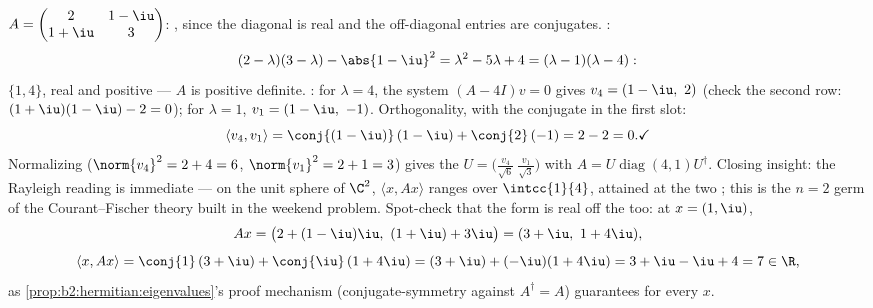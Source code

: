 \begin{example}\label{ex:b2:hermitian:pdrun}
$A = \begin{pmatrix} 2 & 1-\iu\\ 1+\iu & 3\end{pmatrix}$:
, since the diagonal is real and the off-diagonal
entries are conjugates. :
\[
(2-\lambda)(3-\lambda) - \abs{1-\iu}^2
= \lambda^2 - 5\lambda + 4
= (\lambda - 1)(\lambda - 4) :
\]
 $\{1, 4\}$, real and positive --- $A$ is positive
definite. : for $\lambda = 4$, the system $(A -
4I)v = 0$ gives $v_4 = (1 - \iu,\ 2)$ (check the second row:
$(1+\iu)(1-\iu) - 2 = 0$); for $\lambda = 1$, $v_1 = (1 - \iu,\
-1)$. Orthogonality, with the conjugate in the first slot:
\[
\langle v_4, v_1\rangle
= \conj{(1-\iu)}\,(1-\iu) + \conj{2}\,(-1)
= 2 - 2 = 0 . \checkmark
\]
Normalizing ($\norm{v_4}^2 = 2 + 4 = 6$, $\norm{v_1}^2 = 2 + 1
= 3$) gives the  $U = \bigl(\frac{v_4}{\sqrt6}\
\frac{v_1}{\sqrt3}\bigr)$ with $A =
U\operatorname{diag}(4,1)U^\dagger$. Closing insight: the
Rayleigh reading is immediate --- on the unit sphere of
$\C^2$, $\langle x, Ax\rangle$ ranges over $\intcc{1}{4}$,
attained at the two ; this is the $n = 2$ germ of
the Courant--Fischer theory built in the weekend problem.
Spot-check that the form is real off the \omterm{def:b2:reduction:eigen}{eigenvectors} too: at
$x = (1, \iu)$,
\[
Ax = \bigl(2 + (1-\iu)\iu,\ (1+\iu) + 3\iu\bigr)
= (3 + \iu,\ 1 + 4\iu),
\]
\[
\langle x, Ax\rangle = \conj{1}\,(3+\iu) +
\conj{\iu}\,(1+4\iu)
= (3 + \iu) + (-\iu)(1 + 4\iu) = 3 + \iu - \iu + 4 = 7 \in
\R ,
\]
as \cref{prop:b2:hermitian:eigenvalues}'s proof mechanism
(conjugate-symmetry against $A^\dagger = A$) guarantees for
every $x$.
\end{example}

